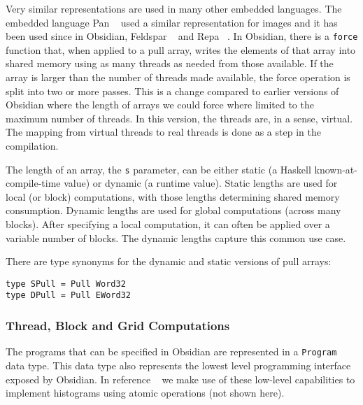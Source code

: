 Very similar representations are used 
in many other embedded languages. The 
embedded language Pan ~ used a similar representation for 
images and it has been used since in Obsidian, Feldspar ~ 
and Repa ~. In Obsidian, there is a {\tt force} function that,
when applied to a pull array, writes the elements of that array 
into shared memory using as many threads as needed from those available. 
If the array is larger than the number of threads made available, the 
force operation is split into two or more passes. This is a change compared
to earlier versions of Obsidian where the length of arrays we could force 
where limited to the maximum number of threads. In this version, the 
threads are, in a sense, virtual. The mapping from virtual threads to 
real threads is done as a step in the compilation.  


The length of an array, the {\tt s} parameter,
can be either static (a Haskell known-at-compile-time value) or dynamic 
(a runtime value). Static lengths are used for local (or block) 
computations, with those lengths determining shared memory consumption. Dynamic 
lengths are used for global computations (across many blocks). After specifying 
a local computation, it can often be applied over a variable number of blocks. 
The dynamic lengths capture this common use case.

There are type synonyms for the dynamic and static versions of  pull arrays: 

\begin{small}
\begin{verbatim}
type SPull = Pull Word32 
type DPull = Pull EWord32 
\end{verbatim}
\end{small} 

\subsubsection{Thread, Block and Grid Computations} 
\label{sec:Program}

The programs that can be specified in Obsidian
are represented in a {\tt Program} data type.
This data type also represents the lowest level programming interface 
exposed by Obsidian. In reference ~ we make use of these low-level 
capabilities to implement histograms using atomic operations (not shown here). 

